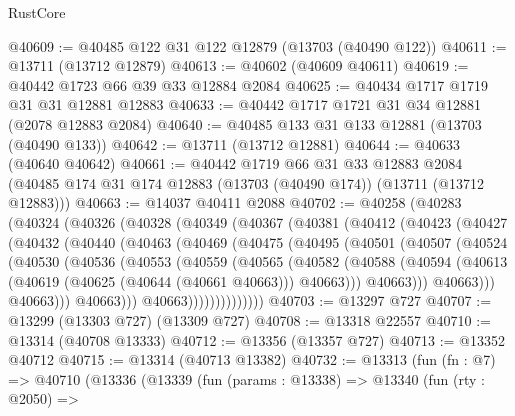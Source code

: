 \begin{lexlean}{RustCore}
\begin{coremodule}
@40609 := @40485 @122 @31 @122 @12879 (@13703 (@40490 @122))
@40611 := @13711 (@13712 @12879)
@40613 := @40602 (@40609 @40611)
@40619 := @40442 @1723 @66 @39 @33 @12884 @2084
@40625 := @40434 @1717 @1719 @31 @31 @12881 @12883
@40633 := @40442 @1717 @1721 @31 @34 @12881 (@2078 @12883 @2084)
@40640 := @40485 @133 @31 @133 @12881 (@13703 (@40490 @133))
@40642 := @13711 (@13712 @12881)
@40644 := @40633 (@40640 @40642)
@40661 := @40442
    @1719
    @66
    @31
    @33
    @12883
    @2084
    (@40485 @174 @31 @174 @12883 (@13703 (@40490 @174)) (@13711 (@13712 @12883)))
@40663 := @14037 @40411 @2088
@40702 := @40258
    (@40283
      (@40324
        (@40326
          (@40328
            (@40349
              (@40367
                (@40381
                  (@40412
                    (@40423
                      (@40427
                        (@40432
                          (@40440
                            (@40463
                              (@40469
                                (@40475
                                  (@40495
                                    (@40501
                                      (@40507
                                        (@40524
                                          (@40530
                                            (@40536
                                              (@40553
                                                (@40559
                                                  (@40565
                                                    (@40582
                                                      (@40588
                                                        (@40594
                                                          (@40613
                                                            (@40619
                                                              (@40625 (@40644 (@40661 @40663)))
                                                              @40663)))
                                                        @40663)))
                                                  @40663)))
                                            @40663)))
                                      @40663)))
                                @40663))))))))))))))
@40703 := @13297 @727
@40707 := @13299 (@13303 @727) (@13309 @727)
@40708 := @13318 @22557
@40710 := @13314 (@40708 @13333)
@40712 := @13356 (@13357 @727)
@40713 := @13352 @40712
@40715 := @13314 (@40713 @13382)
@40732 := @13313
    (fun (fn : @7) =>
    @40710
      (@13336
        (@13339
          (fun (params : @13338) =>
          @13340
            (fun (rty : @2050) =>

\end{coremodule}
\end{lexlean}
